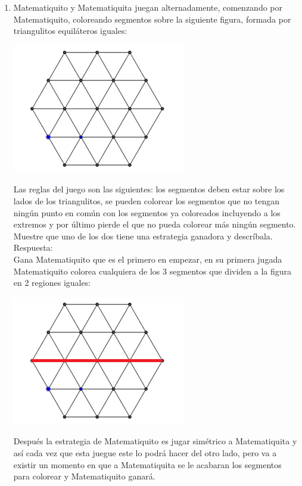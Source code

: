 \documentclass{book}
\begin{document}
\begin{enumerate}
    \item Matematiquito y Matematiquita juegan alternadamente, comenzando por Matematiquito, coloreando segmentos sobre la siguiente figura, formada por triangulitos equiláteros iguales:
          \begin{center}
              \includegraphics[scale=1]{imagenes/Combinatoria/11.png}
          \end{center}
          Las reglas del juego son las siguientes: los segmentos deben estar sobre los lados de los triangulitos, se pueden colorear los segmentos que no tengan ningún punto en común con los segmentos ya coloreados incluyendo a los extremos y por último pierde el que no pueda colorear más ningún segmento. Muestre que uno de los dos tiene una estrategia ganadora y descríbala.\\
          Respuesta:\\
          Gana Matematiquito que es el primero en empezar, en su primera jugada Matematiquito colorea cualquiera de los 3 segmentos que dividen a la figura en 2 regiones iguales:
          \begin{center}
              \includegraphics[scale=1]{imagenes/Combinatoria/Respuesta11.png}
          \end{center}
          Después la estrategia de Matematiquito es jugar simétrico a Matematiquita y así cada vez que esta juegue este lo podrá hacer del otro lado, pero va a existir un momento en que a Matematiquita se le acabaran los segmentos para colorear y Matematiquito ganará. \\

\end{enumerate}
\end{document}
